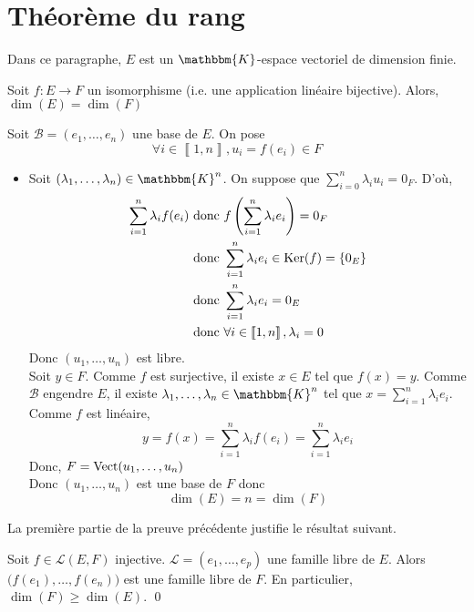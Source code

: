 \part{Théorème du rang}

Dans ce paragraphe, $E$ est un $\mathbbm{K}$-espace vectoriel de dimension finie.

\begin{prop}
	Soit $f: E \to F$ un isomorphisme (i.e. une application linéaire bijective). Alors, $\dim(E) = \dim(F)$
\end{prop}

\begin{prv}
	Soit $\mathcal{B} = (e_1, \ldots, e_n)$ une base de $E$. On pose \[
		\forall i \in \left\llbracket 1,n \right\rrbracket, u_i = f(e_i) \in F
	\]
	\begin{itemize}
		\item Soit $(\lambda_1, \ldots, \lambda_n)\in \mathbbm{K}^n$. On suppose que $\sum_{i=0}^n \lambda_i u_i = 0_F$. D'où,
			\begin{align*}
				\sum_{i=1}^n\lambda_i f(e_i) &\text{ donc } f\left( \sum_{i=1}^n \lambda_i e_i \right) = 0_F\\
				&\text{ donc } \sum_{i=1}^n \lambda_i e_i \in \operatorname{Ker}(f) = \{0_E\}\\
				&\text{ donc } \sum_{i=1}^n \lambda_i e_i = 0_E\\
				&\text{ donc } \forall i \in \left\llbracket 1,n \right\rrbracket, \lambda_i = 0
			\end{align*}
			Donc $(u_1, \ldots, u_n)$ est libre.\\
			Soit $y \in F$. Comme $f$ est surjective, il existe $x \in E$ tel que $f(x) = y$. Comme $\mathcal{B}$ engendre $E$, il existe $\lambda_1, \ldots, \lambda_n \in \mathbbm{K}^n$ tel que $x = \sum_{i=1}^n \lambda_i e_i$. Comme $f$ est linéaire, \[
				y = f(x) = \sum_{i=1}^n \lambda_i f(e_i) = \sum_{i=1}^n \lambda_i e_i
			\] Donc, $F = \operatorname{Vect}(u_1, \ldots, u_n)$ \\
			Donc $(u_1, \ldots, u_n)$ est une base de $F$ donc \[
				\dim(E) = n = \dim(F)
			\]
	\end{itemize}
\end{prv}

La première partie de la preuve précédente justifie le résultat suivant.\\[3mm]

\begin{prop}
	Soit $f \in \mathcal{L}(E,F)$ injective. $\mathcal{L} = (e_1, \ldots, e_p)$ une famille libre de $E$. Alors $\big(f(e_1), \ldots, f(e_n)\big)$ est une famille libre de $F$. En particulier, $\dim(F) \ge \dim(E)$.
	\qed
\end{prop}

